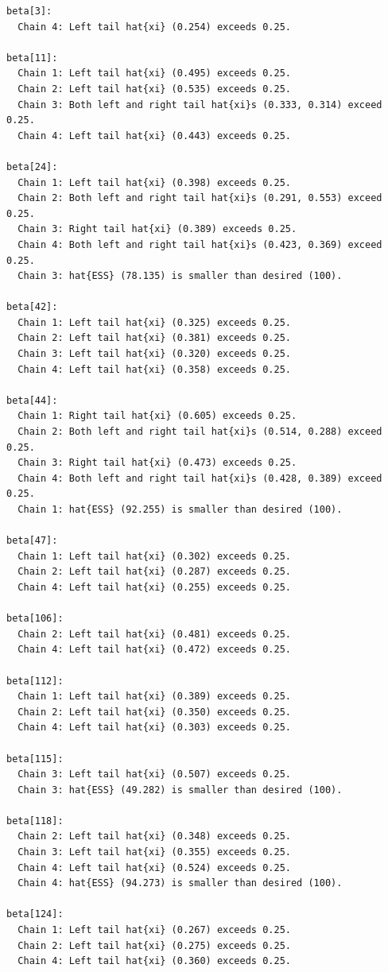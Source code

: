 \documentclass[
  letterpaper,
  DIV=11,
  numbers=noendperiod]{scrartcl}
\begin{document}
\begin{verbatim}
beta[3]:
  Chain 4: Left tail hat{xi} (0.254) exceeds 0.25.

beta[11]:
  Chain 1: Left tail hat{xi} (0.495) exceeds 0.25.
  Chain 2: Left tail hat{xi} (0.535) exceeds 0.25.
  Chain 3: Both left and right tail hat{xi}s (0.333, 0.314) exceed 0.25.
  Chain 4: Left tail hat{xi} (0.443) exceeds 0.25.

beta[24]:
  Chain 1: Left tail hat{xi} (0.398) exceeds 0.25.
  Chain 2: Both left and right tail hat{xi}s (0.291, 0.553) exceed 0.25.
  Chain 3: Right tail hat{xi} (0.389) exceeds 0.25.
  Chain 4: Both left and right tail hat{xi}s (0.423, 0.369) exceed 0.25.
  Chain 3: hat{ESS} (78.135) is smaller than desired (100).

beta[42]:
  Chain 1: Left tail hat{xi} (0.325) exceeds 0.25.
  Chain 2: Left tail hat{xi} (0.381) exceeds 0.25.
  Chain 3: Left tail hat{xi} (0.320) exceeds 0.25.
  Chain 4: Left tail hat{xi} (0.358) exceeds 0.25.

beta[44]:
  Chain 1: Right tail hat{xi} (0.605) exceeds 0.25.
  Chain 2: Both left and right tail hat{xi}s (0.514, 0.288) exceed 0.25.
  Chain 3: Right tail hat{xi} (0.473) exceeds 0.25.
  Chain 4: Both left and right tail hat{xi}s (0.428, 0.389) exceed 0.25.
  Chain 1: hat{ESS} (92.255) is smaller than desired (100).

beta[47]:
  Chain 1: Left tail hat{xi} (0.302) exceeds 0.25.
  Chain 2: Left tail hat{xi} (0.287) exceeds 0.25.
  Chain 4: Left tail hat{xi} (0.255) exceeds 0.25.

beta[106]:
  Chain 2: Left tail hat{xi} (0.481) exceeds 0.25.
  Chain 4: Left tail hat{xi} (0.472) exceeds 0.25.

beta[112]:
  Chain 1: Left tail hat{xi} (0.389) exceeds 0.25.
  Chain 2: Left tail hat{xi} (0.350) exceeds 0.25.
  Chain 4: Left tail hat{xi} (0.303) exceeds 0.25.

beta[115]:
  Chain 3: Left tail hat{xi} (0.507) exceeds 0.25.
  Chain 3: hat{ESS} (49.282) is smaller than desired (100).

beta[118]:
  Chain 2: Left tail hat{xi} (0.348) exceeds 0.25.
  Chain 3: Left tail hat{xi} (0.355) exceeds 0.25.
  Chain 4: Left tail hat{xi} (0.524) exceeds 0.25.
  Chain 4: hat{ESS} (94.273) is smaller than desired (100).

beta[124]:
  Chain 1: Left tail hat{xi} (0.267) exceeds 0.25.
  Chain 2: Left tail hat{xi} (0.275) exceeds 0.25.
  Chain 4: Left tail hat{xi} (0.360) exceeds 0.25.


\end{verbatim}
\end{document}
